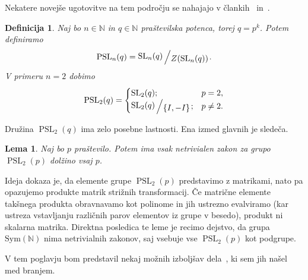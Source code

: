 \documentclass[12pt,a4paper]{article}
\newcounter{theoremcounter}[section] %
\newtheorem{lema}[theoremcounter]{Lema}
\newtheorem{definicija}[theoremcounter]{Definicija}
\newcommand{\quot}[2]{{\raisebox{0.1em}{$#1$}\left/\raisebox{-0.2em}{$#2$}\right.}}
\begin{document}
\noindent
Nekatere novejše ugotovitve na tem področju se nahajajo v člankih~\cite{Bradford_Thom_2022} in~\cite{Bradford_Jakob_Schneider_Thom_2023}.
\begin{definicija}
Naj bo $n \in \mathbb{N}$ in $q \in \mathbb{N}$ praštevilska potenca, torej $q = p^{k}$. Potem definiramo \begin{equation*}
    \operatorname{PSL}_n(q) = \quot{\operatorname{SL}_n(q)}{Z(\operatorname{SL}_n(q))}.
 \end{equation*}   
V primeru $n = 2$ dobimo
\begin{equation*}
            \operatorname{PSL}_2(q) = \begin{cases}
                \operatorname{SL}_2(q); & p = 2,  \\
                \quot{\operatorname{SL}_2(q)}{\left\{ I, -I \right\} }; & p \neq 2.
            \end{cases}
         \end{equation*}   
\end{definicija}
\noindent
Družina $\operatorname{PSL}_2(q)$ ima zelo posebne lastnosti. Ena izmed glavnih je sledeča. 
\begin{lema}
Naj bo $p$ praštevilo. Potem ima vsak netrivialen zakon za grupo $\operatorname{PSL}_2(p)$ dolžino vsaj $p$.
\end{lema}
\noindent
Ideja dokaza je, da elemente grupe $\operatorname{PSL}_2(p)$ predstavimo z matrikami, nato pa opazujemo produkte matrik strižnih transformacij. Če matrične elemente takšnega produkta obravnavamo kot polinome in jih ustrezno evalviramo (kar ustreza vstavljanju različnih parov elementov iz grupe v besedo), produkt ni skalarna matrika. Direktna posledica te leme je recimo dejstvo, da grupa $\text{Sym}(\mathbb{N})$ nima
netrivialnih zakonov, saj vsebuje vse $\operatorname{PSL}_2(p)$ kot podgrupe.


\noindent
V tem poglavju bom predstavil nekaj možnih izboljšav dela~\cite{Schneider_2016}, ki sem jih našel med branjem.
\end{document}
